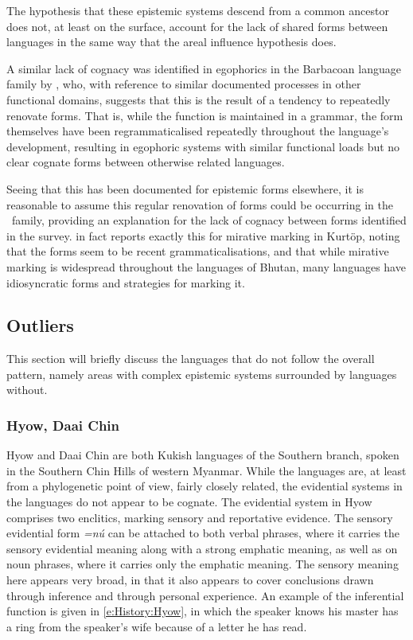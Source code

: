 The hypothesis that these epistemic systems descend from a common ancestor does not, at least on the surface, account for the lack of shared forms between languages in the same way that the areal influence hypothesis does.

A similar lack of cognacy was identified in egophorics in the Barbacoan language family by , who, with reference to similar documented processes in other functional domains, suggests that this is the result of a tendency to repeatedly renovate forms. That is, while the function is maintained in a grammar, the form themselves have been regrammaticalised repeatedly throughout the language's development, resulting in egophoric systems with similar functional loads but no clear cognate forms between otherwise related languages.

Seeing that this has been documented for epistemic forms elsewhere, it is reasonable to assume this regular renovation of forms could be occurring in the \lfam\ family, providing an explanation for the lack of cognacy between forms identified in the survey.  in fact reports exactly this for mirative marking in Kurtöp, noting that the forms seem to be recent grammaticalisations, and that while mirative marking is widespread throughout the languages of Bhutan, many languages have idiosyncratic forms and strategies for marking it.

\subsection{Outliers}\label{ss:History:Outliers}
This section will briefly discuss the languages that do not follow the overall pattern, namely areas with complex epistemic systems surrounded by languages without. 

\subsubsection{Hyow, Daai Chin}
Hyow \cite{Zakaria2018} and Daai Chin \cite{SoHartmann2009} are both Kukish languages of the Southern branch, spoken in the Southern Chin Hills of western Myanmar. While the languages are, at least from a phylogenetic point of view, fairly closely related, the evidential systems in the languages do not appear to be cognate.
The evidential system in Hyow \cite[Kukish: Myanmar,][486]{Zakaria2018} comprises two enclitics, marking sensory and reportative evidence. The sensory evidential form \textit{=nú} can be attached to both verbal phrases, where it carries the sensory evidential meaning along with a strong emphatic meaning, as well as on noun phrases, where it carries only the emphatic meaning. The sensory meaning here appears very broad, in that it also appears to cover conclusions drawn through inference and through personal experience. An example of the inferential function is given in \ref{e:History:Hyow}, in which the speaker knows his master has a ring from the speaker's wife because of a letter he has read.

